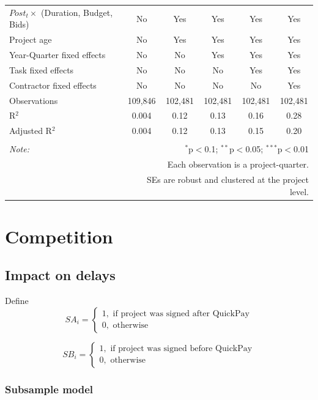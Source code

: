 \documentclass[]{article}
\begin{document}
\begin{table}[H]
\begin{tabular}{@{\extracolsep{-2pt}}lccccc}
$Post_t \times $  (Duration, Budget, Bids) & No & Yes & Yes & Yes & Yes \\ 
Project age & No & Yes & Yes & Yes & Yes \\ 
Year-Quarter fixed effects & No & No & Yes & Yes & Yes \\ 
Task fixed effects & No & No & No & Yes & Yes \\ 
Contractor fixed effects & No & No & No & No & Yes \\ 
Observations & 109,846 & 102,481 & 102,481 & 102,481 & 102,481 \\ 
R$^{2}$ & 0.004 & 0.12 & 0.13 & 0.16 & 0.28 \\ 
Adjusted R$^{2}$ & 0.004 & 0.12 & 0.13 & 0.15 & 0.20 \\ 
\hline 
\hline \\[-1.8ex] 
\textit{Note:}  & \multicolumn{5}{r}{$^{*}$p$<$0.1; $^{**}$p$<$0.05; $^{***}$p$<$0.01} \\ 
 & \multicolumn{5}{r}{Each observation is a project-quarter.} \\ 
 & \multicolumn{5}{r}{SEs are robust and clustered at the project level.} \\ 
\end{tabular} 
\end{table}

\hypertarget{competition}{%
\section{Competition}\label{competition}}

\hypertarget{impact-on-delays}{%
\subsection{Impact on delays}\label{impact-on-delays}}

Define
\[ SA_i = \begin{cases} 1, \text{ if project was signed after QuickPay}\\
0, \text{ otherwise} \end{cases}\]

\[ SB_i = \begin{cases} 1, \text{ if project was signed before QuickPay}\\
0, \text{ otherwise} \end{cases}\]

\hypertarget{subsample-model}{%
\subsubsection{Subsample model}\label{subsample-model}}
\end{document}

